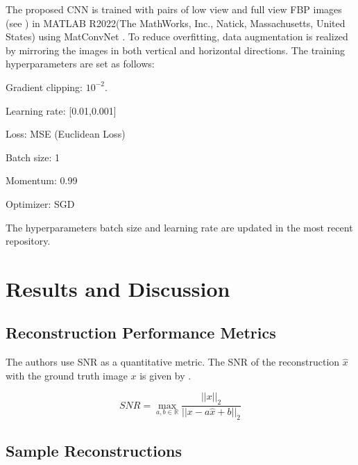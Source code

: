 \documentclass[journal, onecolumn, 11pt]{IEEEtran}
\begin{document}
The proposed CNN is trained with pairs of low view and full view FBP images (see ) in MATLAB R2022(The MathWorks, Inc., Natick, Massachusetts, United States) using MatConvNet \cite{vedaldi2015matconvnet}. To reduce overfitting, data augmentation is realized by mirroring the images in both vertical and horizontal directions. The training hyperparameters are set as follows: 

\begin{itemize}
\begin{multicols}{3}
    \item Gradient clipping: $10^{-2}$.
    \item Learning rate: [0.01,0.001]
    \item Loss: MSE (Euclidean Loss)
    \item Batch size: 1
    \item Momentum: 0.99
    \item Optimizer: SGD
    \end{multicols}
\end{itemize}

The hyperparameters batch size and learning rate are updated in the most recent repository.

\section{Results and Discussion}

\subsection{Reconstruction Performance Metrics}
The authors use SNR as a quantitative metric. The SNR of the reconstruction $\hat{x}$ with the ground truth image $x$ is given by .

\begin{equation}
    SNR = \operatorname*{max}_{a,b \in \mathbb{R}} \frac{||x||_2}{||x - a\hat{x} + b||_2}
    \label{eqn:SNR}
\end{equation}

\subsection{Sample Reconstructions}

\end{document}
